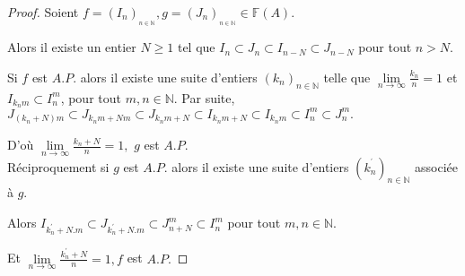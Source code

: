 \begin{proof}
	Soient $f=(I_{n})_{_{n\in \mathbb{N}}},g=(J_{n})_{_{n\in\mathbb{N}}}\in \mathbb{F}(A).$
	
	Alors il existe un entier $N\geq 1$ tel que $I_{n}\subset J_{n}\subset
	I_{n-N}\subset J_{n-N}$ pour tout $n> N.$
	
	Si $f$ est $A.P.$ alors il existe une suite d'entiers $(k_{n})_{n\in \mathbb{N}}$ telle que $\underset{n\longrightarrow \infty }{\lim }\frac{k_{n}}{n}=1$ et $I_{k_{n}m}\subset I_{n}^{m}$,
	pour tout $m,n\in \mathbb{N}.$
	Par suite, $J_{(k_{n}+N)m}\subset J_{k_{n}m+Nm}\subset J_{k_{n}m+N}\subset I_{k_{n}m+N}\subset I_{k_{n}m}\subset I_{n}^{m}\subset J_{n}^{m}.$
	
	D'où $\underset{n\longrightarrow \infty }{\lim }\frac{k_{n}+N}{n}=1,$ $g$ est $A.P.$\\
	Réciproquement si $g$ est $A.P.$ alors il existe une suite d'entiers $(k_{n}^{^{\prime }})_{n\in \mathbb{N}}$ associée à $g.$
	
	Alors $I_{k_{n}^{\prime }+N.m}\subset J_{k_{n}^{\prime }+N.m}\subset J_{n+N}^{m}\subset I_{n}^{m}$ pour tout $m,n\in \mathbb{N}.$
	
	Et $\underset{n\longrightarrow \infty }{\lim }\frac{k_{n}^{\prime }+N}{n}=1,f$ est $A.P.$
\end{proof}

